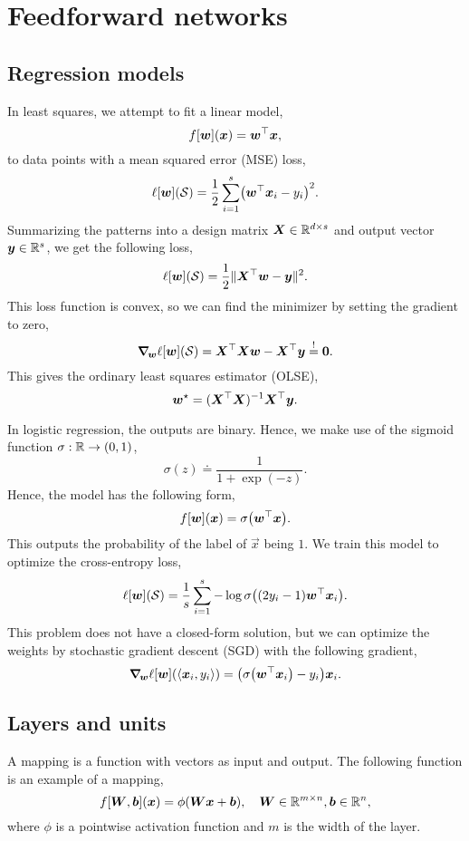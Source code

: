 \section{Feedforward networks}

\subsection{Regression models}

In least squares, we attempt to fit a linear model, \[
    f[\vec{w}](\vec{x}) = \transpose{\vec{w}}\vec{x},
\]
to data points with a mean squared error (MSE) loss, \[
    \ell[\vec{w}](\mathcal{S}) = \frac{1}{2} \sum_{i=1}^{s} \lft( \transpose{\vec{w}} \vec{x}_i - y_i \rgt)^2.
\]
Summarizing the patterns into a design matrix $\mat{X} \in \R^{d \times s}$ and output vector
$\vec{y} \in \R^s$, we get the following loss, \[
    \ell[\vec{w}](\mathcal{S}) = \frac{1}{2} \| \transpose{\mat{X}} \vec{w} - \vec{y} \|^2.
\]
This loss function is convex, so we can find the minimizer by setting the gradient to zero, \[
    \grad{\ell[\vec{w}](\mathcal{S})}{\vec{w}} = \transpose{\mat{X}} \mat{X} \vec{w} - \transpose{\mat{X}} \vec{y} \condeq \vec{0}.
\]
This gives the ordinary least squares estimator (OLSE), \[
    \vec{w}^\star = \inv{(\transpose{\mat{X}} \mat{X})} \transpose{\mat{X}} \vec{y}.
\]

In logistic regression, the outputs are binary. Hence, we make use of the sigmoid function $\sigma:
    \R \to (0,1)$, \[
    \sigma(z) \doteq \frac{1}{1 + \exp(-z)}.
\]
Hence, the model has the following form, \[
    f[\vec{w}](\vec{x}) = \sigma \lft( \transpose{\vec{w}}\vec{x} \rgt).
\]
This outputs the probability of the label of $\vec{x}$ being $1$. We train this model to optimize
the cross-entropy loss, \[
    \ell[\vec{w}](\mathcal{S}) = \frac{1}{s} \sum_{i=1}^{s} -\log \sigma \lft( (2y_i - 1) \transpose{\vec{w}} \vec{x}_i \rgt).
\]
This problem does not have a closed-form solution, but we can optimize the weights by stochastic
gradient descent (SGD) with the following gradient, \[
    \grad{\ell[\vec{w}](\langle \vec{x}_i, y_i \rangle)}{\vec{w}} = \lft( \sigma \lft( \transpose{\vec{w}} \vec{x}_i \rgt) - y_i \rgt) \vec{x}_i.
\]

\subsection{Layers and units}

A mapping is a function with vectors as input and output. The following function is an example of a
mapping, \[
    f[\mat{W}, \vec{b}](\vec{x}) = \phi(\mat{W} \vec{x} + \vec{b}), \quad \mat{W} \in \R^{m \times n}, \vec{b} \in \R^n,
\]
where $\phi$ is a pointwise activation function and $m$ is the width of the layer.

